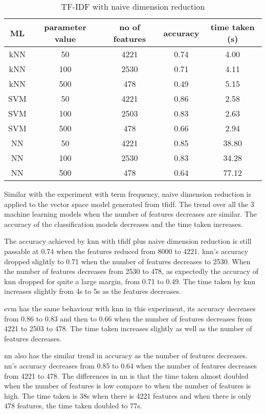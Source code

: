 \begin{table} [ht]
	\centering
	\begin{tabular}{|| c | c | c | c | c||}
		\hline
		ML & parameter value & no of features & accuracy & time taken (s) \\ [0.5ex]
		\hline\hline
		kNN & 50 & 4221 & 0.74 & 4.00 \\ 
		\hline
		kNN & 100 & 2530 & 0.71 & 4.11 \\ 
		\hline
		kNN & 500 & 478 & 0.49 & 5.15 \\ 
		\hline\hline
		SVM & 50 & 4221 & 0.86 & 2.58 \\
		\hline
		SVM & 100 & 2503 & 0.83 & 2.63 \\
		\hline
		SVM & 500 & 478 & 0.66 & 2.94 \\
		\hline\hline
		NN & 50 & 4221 & 0.85 & 38.80 \\
		\hline
		NN & 100 & 2530 & 0.83 & 34.28 \\
		\hline
		NN & 500 & 478 & 0.64 & 77.12 \\
		\hline
	\end{tabular}
\caption{TF-IDF with naive dimension reduction}
\label{tbl:tfidfNaive}
\end{table}

Similar with the experiment with term frequency, naive dimension reduction is applied to the vector space model generated from \ac{tfidf}. The trend over all the 3 machine learning models when the number of features decreases are similar. The accuracy of the classification models decreases and the time taken increases. 

The accuracy achieved by \ac{knn} with \ac{tfidf} plus naive dimension reduction is still passable at 0.74 when the features reduced from 8000 to 4221. \Ac{knn}'s accuracy dropped slightly to 0.71 when the number of features decreases to 2530. When the number of features decreases from 2530 to 478, as expectedly the accuracy of \ac{knn} dropped for quite a large margin, from 0.71 to 0.49. The time taken by \ac{knn} increases slightly from 4s to 5s as the features decreases.

\Ac{svm} has the same behaviour with \ac{knn} in this experiment, its accuracy decreases from 0.86 to 0.83 and then to 0.66 when the number of features decreases from 4221 to 2503 to 478. The time taken increases slightly as well as the number of features decreases.

\Ac{nn} also has the similar trend in accuracy as the number of features decreases. \Ac{nn}'s accuracy decreases from 0.85 to 0.64 when the number of features decreases from 4221 to 478. The differences in \ac{nn} is that the time taken almost doubled when the number of features is low compare to when the number of features is high. The time taken is 38s when there is 4221 features and when there is only 478 features, the time taken doubled to 77s.

